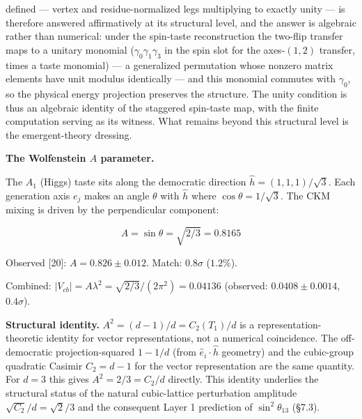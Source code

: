 \documentclass[
]{article}
\begin{document}
defined --- vertex and residue-normalized legs multiplying to exactly
unity --- is therefore answered affirmatively at its structural level,
and the answer is algebraic rather than numerical: under the spin-taste
reconstruction the two-flip transfer maps to a unitary monomial
(\(\gamma_0\gamma_1\gamma_3\) in the spin slot for the axes-\((1,2)\)
transfer, times a taste monomial) --- a generalized permutation whose
nonzero matrix elements have unit modulus identically --- and this
monomial commutes with \(\gamma_0\), so the physical energy projection
preserves the structure. The unity condition is thus an algebraic
identity of the staggered spin-taste map, with the finite computation
serving as its witness. What remains beyond this structural level is the
emergent-theory dressing.

\textbf{The Wolfenstein \(A\) parameter.}

The \(A_1\) (Higgs) taste sits along the democratic direction
\(\hat{h} = (1,1,1)/\sqrt{3}\). Each generation axis \(e_j\) makes an
angle \(\theta\) with \(\hat{h}\) where \(\cos\theta = 1/\sqrt{3}\). The
CKM mixing is driven by the perpendicular component:

\[\boxed{A = \sin\theta = \sqrt{2/3} = 0.8165}\]

Observed {[}20{]}: \(A = 0.826 \pm 0.012\). Match: \(0.8\sigma\)
(\(1.2\%\)).

Combined: \(|V_{cb}| = A\lambda^2 = \sqrt{2/3}/(2\pi^2) = 0.04136\)
(observed: \(0.0408 \pm 0.0014\), \(0.4\sigma\)).

\textbf{Structural identity.} \(A^2 = (d-1)/d = C_2(T_1)/d\) is a
representation-theoretic identity for vector representations, not a
numerical coincidence. The off-democratic projection-squared \(1 - 1/d\)
(from \(\hat e_i \cdot \hat h\) geometry) and the cubic-group quadratic
Casimir \(C_2 = d-1\) for the vector representation are the same
quantity. For \(d=3\) this gives \(A^2 = 2/3 = C_2/d\) directly. This
identity underlies the structural status of the natural cubic-lattice
perturbation amplitude \(\sqrt{C_2}/d = \sqrt 2/3\) and the consequent
Layer 1 prediction of \(\sin^2\theta_{13}\) (§7.3).
\end{document}
